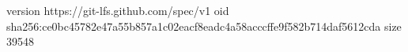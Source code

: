 version https://git-lfs.github.com/spec/v1
oid sha256:ce0bc45782e47a55b857a1c02eacf8eadc4a58acccffe9f582b714daf5612cda
size 39548

